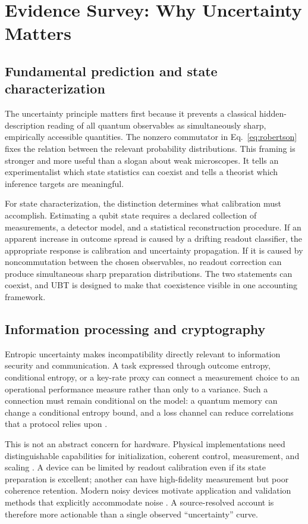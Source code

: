 \documentclass[conference]{../../../../Conference-LaTeX-template_10-17-19/IEEEtran}
\begin{document}
\section{Evidence Survey: Why Uncertainty Matters}

\subsection{Fundamental prediction and state characterization}

The uncertainty principle matters first because it prevents a classical hidden-description reading of all quantum observables as simultaneously sharp, empirically accessible quantities. The nonzero commutator in Eq.~\eqref{eq:robertson} fixes the relation between the relevant probability distributions. This framing is stronger and more useful than a slogan about weak microscopes. It tells an experimentalist which state statistics can coexist and tells a theorist which inference targets are meaningful.

For state characterization, the distinction determines what calibration must accomplish. Estimating a qubit state requires a declared collection of measurements, a detector model, and a statistical reconstruction procedure. If an apparent increase in outcome spread is caused by a drifting readout classifier, the appropriate response is calibration and uncertainty propagation. If it is caused by noncommutation between the chosen observables, no readout correction can produce simultaneous sharp preparation distributions. The two statements can coexist, and UBT is designed to make that coexistence visible in one accounting framework.

\subsection{Information processing and cryptography}

Entropic uncertainty makes incompatibility directly relevant to information security and communication. A task expressed through outcome entropy, conditional entropy, or a key-rate proxy can connect a measurement choice to an operational performance measure rather than only to a variance. Such a connection must remain conditional on the model: a quantum memory can change a conditional entropy bound, and a loss channel can reduce correlations that a protocol relies upon \cite{coles2017,zhang2015}.

This is not an abstract concern for hardware. Physical implementations need distinguishable capabilities for initialization, coherent control, measurement, and scaling \cite{divincenzo2000}. A device can be limited by readout calibration even if its state preparation is excellent; another can have high-fidelity measurement but poor coherence retention. Modern noisy devices motivate application and validation methods that explicitly accommodate noise \cite{bharti2022}. A source-resolved account is therefore more actionable than a single observed ``uncertainty'' curve.
\end{document}
